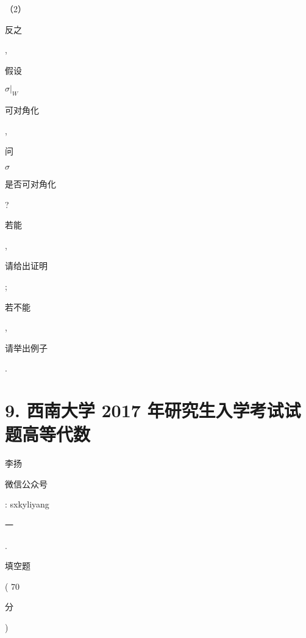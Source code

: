 \documentclass[10pt]{article}
\begin{document}
（2）\begin{CJK}{UTF8}{mj}反之\end{CJK}, \begin{CJK}{UTF8}{mj}假设\end{CJK} $\left.\sigma\right|_{W}$ \begin{CJK}{UTF8}{mj}可对角化\end{CJK}, \begin{CJK}{UTF8}{mj}问\end{CJK} $\sigma$ \begin{CJK}{UTF8}{mj}是否可对角化\end{CJK}? \begin{CJK}{UTF8}{mj}若能\end{CJK}, \begin{CJK}{UTF8}{mj}请给出证明\end{CJK}; \begin{CJK}{UTF8}{mj}若不能\end{CJK}, \begin{CJK}{UTF8}{mj}请举出例子\end{CJK}.

\section{9. 西南大学 2017 年研究生入学考试试题高等代数}
\begin{CJK}{UTF8}{mj}李扬\end{CJK}

\begin{CJK}{UTF8}{mj}微信公众号\end{CJK}: sxkyliyang

\begin{CJK}{UTF8}{mj}一\end{CJK}. \begin{CJK}{UTF8}{mj}填空题\end{CJK}( 70 \begin{CJK}{UTF8}{mj}分\end{CJK})
\end{document}

